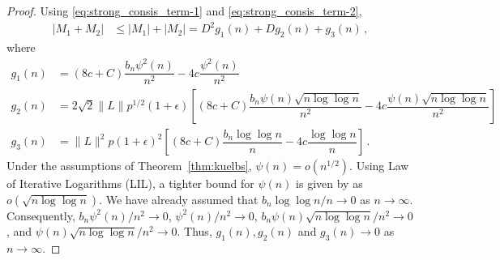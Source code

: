 \documentclass[11pt]{article}
\newtheorem{lemma}{Lemma}
\theoremstyle{remark}
\begin{document}
\begin{proof}
%
Using \eqref{eq:strong_consis_term-1} and \eqref{eq:strong_consis_term-2},
\begin{align*}
|M_1 + M_2|  & \leq |M_1| + |M_2|
   = D^2g_1(n) + D g_2(n) + g_3(n)\,,
\end{align*}
where
\begin{align*}
    g_1(n) &= (8c + C)\dfrac{b_n \psi^2(n)}{n^2} - 4c\dfrac{\psi^2(n)}{n^2}\\
    g_2(n) &= 2\sqrt{2}\|L\|p^{1/2}(1+\epsilon)\left[(8c + C)\dfrac{b_n\psi(n)\sqrt{n\log \log n}}{n^2} - 4c\dfrac{\psi(n)\sqrt{n\log \log n}}{n^2}\right]\\
    g_3(n) &= \|L\|^2 p (1+\epsilon)^2\left[(8c + C)\dfrac{b_n \log\log n}{n} - 4c \dfrac{\log \log n}{n}\right]\,.
\end{align*}
Under the assumptions of Theorem~\ref{thm:kuelbs}, $\psi(n) = o(n^{1/2})$. Using Law of Iterative Logarithms (LIL), a tighter bound for $\psi(n)$ is given by \cite{stra:1964} as $o(\sqrt{n\log \log n})$. We have already assumed that $b_n \log \log n / n \to 0$ as $n \to \infty$. Consequently, 
$b_n \psi^2(n)/n^2 \to 0$, $\psi^2(n)/n^2 \to 0$, ${b_n\psi(n)\sqrt{n\log \log n}/n^2} \to 0$, and $\psi(n) \sqrt{n \log \log n}/n^2 \to 0$. Thus, $g_1(n), g_2(n)$ and $g_3(n) \to 0$ as $n \to \infty$.
\end{proof}
%
\end{document}
